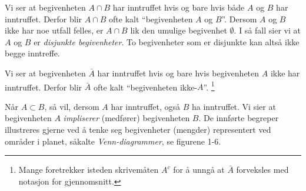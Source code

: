 \begin{center}  \end{center}
\noindent Vi ser at begivenheten $A \cap B$ har inntruffet hvis og bare
hvis både $A$ og $B$ har inntruffet. Derfor blir $A \cap B$ ofte
kalt ``begivenheten $A$ og $B$''. Dersom $A$ og $B$ ikke har
noe utfall felles, er $A \cap B$ lik den umulige begivenhet
$\emptyset$. I så fall sier vi at $A$ og $B$ er {\em disjunkte
begivenheter}. To begivenheter som er disjunkte kan altså ikke
begge inntreffe.

\begin{center}  \end{center}
\noindent Vi ser at begivenheten $\bar{A}$ har inntruffet hvis og bare hvis
begivenheten $A$ ikke har inntruffet. Derfor blir $\bar{A}$ ofte kalt
``begivenheten ikke-$A$''.
\footnote{Mange foretrekker isteden skrivemåten $A^c$ for å unngå
at $\bar{A}$ forveksles med notasjon for gjennomsnitt.}

\begin{center}  \end{center}
\noindent Når $A \subset B$, så vil, dersom $A$ har inntruffet,
også $B$ ha inntruffet. Vi sier at begivenheten $A$ {\em impliserer}
(medfører) begivenheten $B$. De innførte begreper illustreres
gjerne ved å tenke seg begivenheter (mengder) representert ved
områder i planet, såkalte {\em Venn-diagrammer}, se figurene 1-6.



